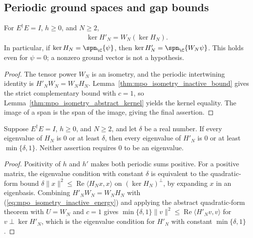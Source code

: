 \subsection{Periodic ground spaces and gap bounds}

\begin{lemma}
    \label{thm:mpo_isometry_positive_kernel}
    \leanok
    For $E^\dagger E=I$, $h\geq0$, and $N\geq2$,
    \begin{align}
        \ker H'_N=W_N(\ker H_N).
        \label{eq:mpo_isometry_kernel_transport}
    \end{align}
    In particular, if $\ker H_N=\spn_{\C}\{\psi\}$, then
    $\ker H'_N=\spn_{\C}\{W_N\psi\}$. This holds even for
    $\psi=0$; a nonzero ground vector is not a hypothesis.
\end{lemma}
\begin{proof}\leanok
    The tensor power $W_N$ is an isometry, and the periodic
    intertwining identity is $H'_NW_N=W_NH_N$.
    Lemma~\ref{thm:mpo_isometry_inactive_bound} gives the strict
    complementary bound with $c=1$, so
    Lemma~\ref{thm:mpo_isometry_abstract_kernel} yields the kernel
    equality. The image of a
    span is the span of the image, giving the final assertion.
\end{proof}

\begin{lemma}
    \label{thm:mpo_isometry_positive_gap}
    \leanok
    Suppose $E^\dagger E=I$, $h\geq0$, and $N\geq2$, and let $\delta$ be
    a real number. If every eigenvalue of $H_N$ is $0$ or at least
    $\delta$, then every eigenvalue of $H'_N$ is $0$ or at least
    $\min\{\delta,1\}$. Neither assertion requires $0$ to be an
    eigenvalue.
\end{lemma}
\begin{proof}\leanok
    Positivity of $h$ and $h'$ makes both periodic sums positive. For a
    positive matrix, the eigenvalue condition with constant $\delta$ is
    equivalent to the quadratic-form bound
    $\delta\|x\|^2\leq\operatorname{Re}\langle H_Nx,x\rangle$ on
    $(\ker H_N)^\perp$, by expanding $x$ in an eigenbasis. Combining
    $H'_NW_N=W_NH_N$ with (\ref{eq:mpo_isometry_inactive_energy}) and
    applying the abstract quadratic-form theorem with $U=W_N$ and $c=1$
    gives
    $\min\{\delta,1\}\|v\|^2\leq\operatorname{Re}\langle H'_Nv,v\rangle$
    for $v\perp\ker H'_N$, which is the eigenvalue condition for $H'_N$
    with constant $\min\{\delta,1\}$.
\end{proof}

